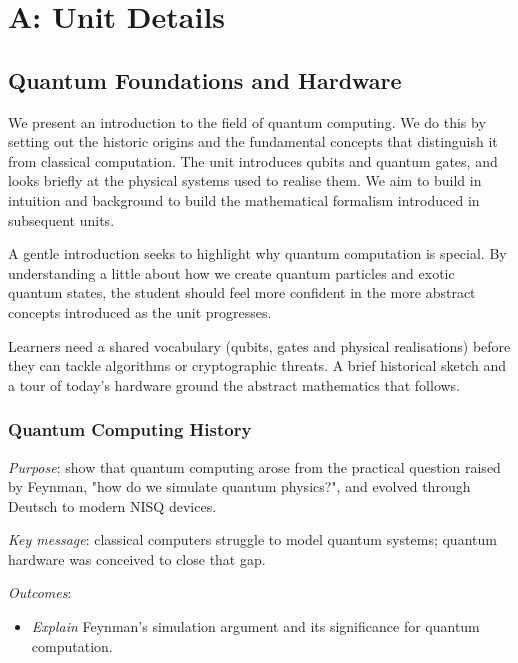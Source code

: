 \section{A: Unit Details}


\subsection{Quantum Foundations and Hardware}

We present an introduction to the field of quantum computing. 
We do this by setting out the historic origins and the fundamental concepts that distinguish it from classical computation.
The unit introduces qubits and quantum gates, and looks briefly at the physical systems used to realise them.
We aim to build in intuition and background to build the mathematical formalism introduced in subsequent units.

A gentle introduction seeks to highlight why quantum computation is special.
By understanding a little about how we create quantum particles and exotic quantum states, 
the student should feel more confident in the more abstract concepts introduced as the unit progresses.

Learners need a shared vocabulary (qubits, gates and physical realisations) before they can tackle algorithms or cryptographic threats. 
A brief historical sketch and a tour of today's hardware ground the abstract mathematics that follows.

\subsubsection*{Quantum Computing History}

\emph{Purpose}: show that quantum computing arose from the practical question raised by Feynman,  "how do we simulate quantum physics?", 
and evolved through Deutsch to modern NISQ devices.

\emph{Key message}: classical computers struggle to model quantum systems; quantum hardware was conceived to close that gap.

\emph{Outcomes}:
\begin{itemize}
	\item \emph{Explain} Feynman's simulation argument and its significance for quantum computation.
\end{itemize}

